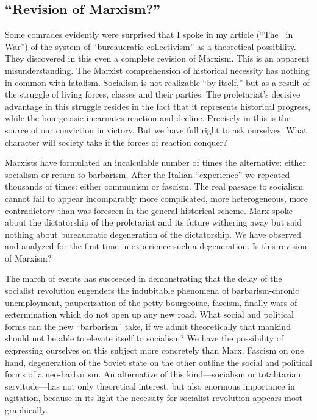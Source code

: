 \subsection*{“Revision of Marxism?”}

Some comrades evidently were surprised that I spoke in my article (``The \USSR\ in War'') of the system of “bureaucratic collectivism” as a theoretical possibility. They discovered in this even a complete revision of Marxism. This is an apparent misunderstanding. The Marxist comprehension of historical necessity has nothing in common with fatalism. Socialism is not realizable “by itself,” but as a result of the struggle of living forces, classes and their parties. The proletariat’s decisive advantage in this struggle resides in the fact that it represents historical progress, while the bourgeoisie incarnates reaction and decline. Precisely in this is the source of our conviction in victory. But we have full right to ask ourselves: What character will society take if the forces of reaction conquer?

Marxists have formulated an incalculable number of times the alternative: either socialism or return to barbarism. After the Italian “experience” we repeated thousands of times: either communism or fascism. The real passage to socialism cannot fail to appear incomparably more complicated, more heterogeneous, more contradictory than was foreseen in the general historical scheme. Marx spoke about the dictatorship of the proletariat and its future withering away but said nothing about bureaucratic degeneration of the dictatorship. We have observed and analyzed for the first time in experience such a degeneration. Is this revision of Marxism?

The march of events has succeeded in demonstrating that the delay of the socialist revolution engenders the indubitable phenomena of barbarism-chronic unemployment, pauperization of the petty bourgeoisie, fascism, finally wars of extermination which do not open up any new road. What social and political forms can the new “barbarism” take, if we admit theoretically that mankind should not be able to elevate itself to socialism? We have the possibility of expressing ourselves on this subject more concretely than Marx. Fascism on one hand, degeneration of the Soviet state on the other outline the social and political forms of a neo-barbarism. An alternative of this kind---socialism or totalitarian servitude---has not only theoretical interest, but also enormous importance in agitation, because in its light the necessity for socialist revolution appears most graphically.

